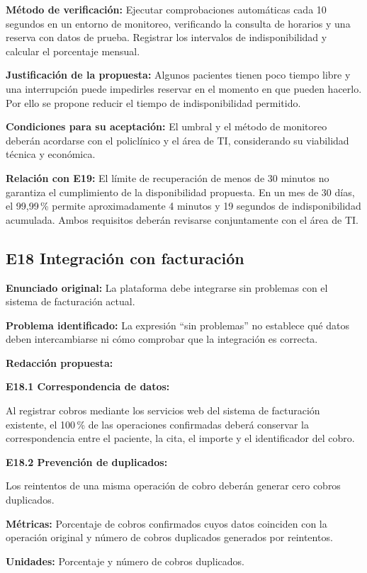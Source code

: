 \documentclass[11pt,a4paper]{article}
\begin{document}
\textbf{Método de verificación:}
Ejecutar comprobaciones automáticas cada
10 segundos en un entorno de monitoreo,
verificando la consulta de horarios y una
reserva con datos de prueba. Registrar los
intervalos de indisponibilidad y calcular
el porcentaje mensual.

\textbf{Justificación de la propuesta:}
Algunos pacientes tienen poco tiempo libre
y una interrupción puede impedirles reservar
en el momento en que pueden hacerlo.
Por ello se propone reducir el tiempo
de indisponibilidad permitido.

\textbf{Condiciones para su aceptación:}
El umbral y el método de monitoreo deberán
acordarse con el policlínico y el área de TI,
considerando su viabilidad técnica y económica.

\textbf{Relación con E19:}
El límite de recuperación de menos de 30 minutos
no garantiza el cumplimiento de la disponibilidad
propuesta. En un mes de 30 días, el 99,99\,\%
permite aproximadamente 4 minutos y 19 segundos
de indisponibilidad acumulada. Ambos requisitos
deberán revisarse conjuntamente con el área de TI.

\subsection{E18 Integración con facturación}

\textbf{Enunciado original:}
La plataforma debe integrarse sin problemas
con el sistema de facturación actual.

\textbf{Problema identificado:}
La expresión ``sin problemas'' no establece
qué datos deben intercambiarse ni cómo
comprobar que la integración es correcta.

\textbf{Redacción propuesta:}

\textbf{E18.1 Correspondencia de datos:}

Al registrar cobros mediante los servicios web
del sistema de facturación existente, el
100\,\% de las operaciones confirmadas deberá
conservar la correspondencia entre el paciente,
la cita, el importe y el identificador del cobro.

\textbf{E18.2 Prevención de duplicados:}

Los reintentos de una misma operación de cobro
deberán generar cero cobros duplicados.

\textbf{Métricas:}
Porcentaje de cobros confirmados cuyos datos
coinciden con la operación original y número
de cobros duplicados generados por reintentos.

\textbf{Unidades:}
Porcentaje y número de cobros duplicados.
\end{document}
